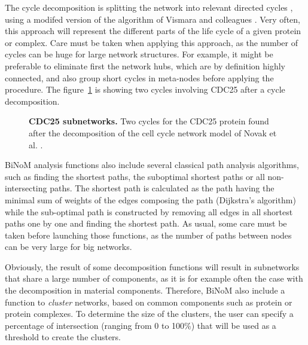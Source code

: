 \documentclass[10pt]{bmc_article}
\newenvironment{bmcformat}{\baselineskip20pt\sloppy\setboolean{publ}{false}}{\baselineskip20pt\sloppy}
\begin{document}
\begin{bmcformat}
The cycle decomposition is splitting the network into relevant directed cycles
\cite{gleiss2001relevant}, using a modifed version of the algorithm of Vismara
and colleagues \cite{vismara1997union}. Very often, this approach will represent
the different parts of the life cycle of a given protein or complex. Care must
be taken when applying this approach, as the number of cycles can be huge for
large network structures. For example, it might be preferable to eliminate first
the network hubs, which are by definition highly connected, and also group short
cycles in meta-nodes before applying the procedure. The figure~\ref{mphasecdc25cycles} is showing two
cycles involving CDC25 after a cycle decomposition.

\begin{figure}[h]
 \caption{\label{mphasecdc25cycles}  \textbf{CDC25 subnetworks.}
      Two cycles for the CDC25 protein found after the decomposition of the cell cycle network model of Novak et al. \cite{novak1998model}.}
\end{figure}

%
% 

BiNoM analysis functions also include several classical path analysis
algorithms, such as finding the shortest paths, the suboptimal shortest paths or
all non-intersecting paths. The shortest path is calculated as the path having
the minimal sum of weights of the edges composing the path (Dijkstra's
algorithm) while the sub-optimal path is constructed by removing all edges in
all shortest paths one by one and finding the shortest path. As usual, some care
must be taken before launching those functions, as the number of paths between nodes can be
very large for big networks.

Obviously, the result of some decomposition functions will result in subnetworks
that share a large number of components, as it is for example often the case
with the decomposition in material components. Therefore, BiNoM also include a
function to \emph{cluster} networks, based on common components such as protein
or protein complexes. To determine the size of the clusters, the user can
specify a percentage of intersection (ranging from 0 to 100\%) that will be used
as a threshold to create the clusters.


\end{bmcformat}
\end{document}
